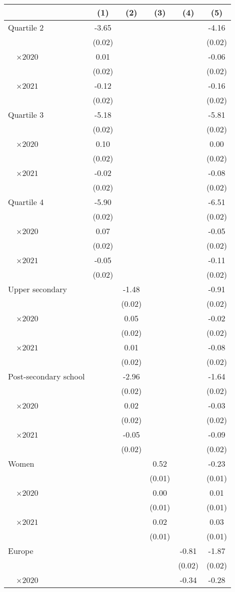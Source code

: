 
\begin{tabular}{@{}l*{5}{S[table-format={-}2.2{\tnote{***}}]}@{}}
\toprule
{} & {(1)} & {(2)} & {(3)} & {(4)} & {(5)}\tabularnewline%
\midrule
Quartile 2 & -3.65\tnote{***} &  &  &  & -4.16\tnote{***}\tabularnewline%
 & (0.02) &  &  &  & \vphantom{8} (0.02)\tabularnewline%
~~\(\times 2020\) & 0.01 &  &  &  & -0.06\tnote{*}\tabularnewline%
 & (0.02) &  &  &  & \vphantom{7} (0.02)\tabularnewline%
~~\(\times 2021\) & -0.12\tnote{***} &  &  &  & -0.16\tnote{***}\tabularnewline%
 & (0.02) &  &  &  & \vphantom{6} (0.02)\tabularnewline%
Quartile 3 & -5.18\tnote{***} &  &  &  & -5.81\tnote{***}\tabularnewline%
 & (0.02) &  &  &  & \vphantom{5} (0.02)\tabularnewline%
~~\(\times 2020\) & 0.10\tnote{***} &  &  &  & 0.00\tabularnewline%
 & (0.02) &  &  &  & \vphantom{4} (0.02)\tabularnewline%
~~\(\times 2021\) & -0.02 &  &  &  & -0.08\tnote{***}\tabularnewline%
 & (0.02) &  &  &  & \vphantom{3} (0.02)\tabularnewline%
Quartile 4 & -5.90\tnote{***} &  &  &  & -6.51\tnote{***}\tabularnewline%
 & (0.02) &  &  &  & \vphantom{2} (0.02)\tabularnewline%
~~\(\times 2020\) & 0.07\tnote{***} &  &  &  & -0.05\tnote{*}\tabularnewline%
 & (0.02) &  &  &  & \vphantom{1} (0.02)\tabularnewline%
~~\(\times 2021\) & -0.05\tnote{**} &  &  &  & -0.11\tnote{***}\tabularnewline%
 & (0.02) &  &  &  & (0.02)\tabularnewline%
Upper secondary &  & -1.48\tnote{***} &  &  & -0.91\tnote{***}\tabularnewline%
 &  & (0.02) &  &  & \vphantom{5} (0.02)\tabularnewline%
~~\(\times 2020\) &  & 0.05\tnote{**} &  &  & -0.02\tabularnewline%
 &  & (0.02) &  &  & \vphantom{4} (0.02)\tabularnewline%
~~\(\times 2021\) &  & 0.01 &  &  & -0.08\tnote{***}\tabularnewline%
 &  & (0.02) &  &  & \vphantom{3} (0.02)\tabularnewline%
Post-secondary school &  & -2.96\tnote{***} &  &  & -1.64\tnote{***}\tabularnewline%
 &  & (0.02) &  &  & \vphantom{2} (0.02)\tabularnewline%
~~\(\times 2020\) &  & 0.02 &  &  & -0.03\tabularnewline%
 &  & (0.02) &  &  & \vphantom{1} (0.02)\tabularnewline%
~~\(\times 2021\) &  & -0.05\tnote{**} &  &  & -0.09\tnote{***}\tabularnewline%
 &  & (0.02) &  &  & (0.02)\tabularnewline%
Women &  &  & 0.52\tnote{***} &  & -0.23\tnote{***}\tabularnewline%
 &  &  & (0.01) &  & \vphantom{2} (0.01)\tabularnewline%
~~\(\times 2020\) &  &  & 0.00 &  & 0.01\tabularnewline%
 &  &  & (0.01) &  & \vphantom{1} (0.01)\tabularnewline%
~~\(\times 2021\) &  &  & 0.02 &  & 0.03\tnote{**}\tabularnewline%
 &  &  & (0.01) &  & (0.01)\tabularnewline%
Europe &  &  &  & -0.81\tnote{***} & -1.87\tnote{***}\tabularnewline%
 &  &  &  & (0.02) & \vphantom{5} (0.02)\tabularnewline%
~~\(\times 2020\) &  &  &  & -0.34\tnote{***} & -0.28\tnote{***}\tabularnewline%

\end{tabular}
